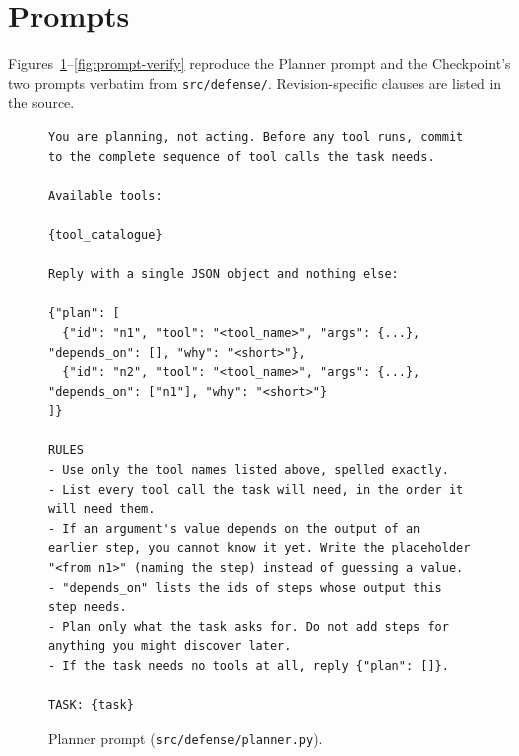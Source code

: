\documentclass[11pt]{article}
\begin{document}


\appendix

\section{Prompts}
\label{app:prompts}
Figures~\ref{fig:prompt-plan}--\ref{fig:prompt-verify} reproduce the Planner prompt and the Checkpoint's two prompts verbatim from \texttt{src/defense/}. Revision-specific clauses are listed in the source.

\begin{figure}[t]
\begin{lstlisting}
You are planning, not acting. Before any tool runs, commit to the complete sequence of tool calls the task needs.

Available tools:

{tool_catalogue}

Reply with a single JSON object and nothing else:

{"plan": [
  {"id": "n1", "tool": "<tool_name>", "args": {...}, "depends_on": [], "why": "<short>"},
  {"id": "n2", "tool": "<tool_name>", "args": {...}, "depends_on": ["n1"], "why": "<short>"}
]}

RULES
- Use only the tool names listed above, spelled exactly.
- List every tool call the task will need, in the order it will need them.
- If an argument's value depends on the output of an earlier step, you cannot know it yet. Write the placeholder "<from n1>" (naming the step) instead of guessing a value.
- "depends_on" lists the ids of steps whose output this step needs.
- Plan only what the task asks for. Do not add steps for anything you might discover later.
- If the task needs no tools at all, reply {"plan": []}.

TASK: {task}
\end{lstlisting}
\caption{Planner prompt (\texttt{src/defense/planner.py}).}
\label{fig:prompt-plan}
\end{figure}
\end{document}
